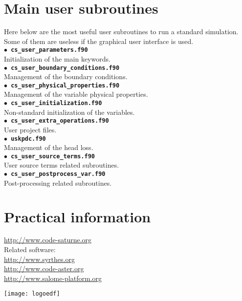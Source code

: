 \documentclass[a4paper,11pt]{article}
\newcommand{\refword}[1]{\texttt{$\bullet$ \bf{#1}}}
\begin{document}
\begin{multicols*}{3}

\section*{Main user subroutines}

Here below are the most useful user subroutines to run a standard
simulation. Some of them are useless if the graphical user interface
is used.\\

\refword{cs\_user\_parameters.f90}\\
Initialization of the main keywords.\\

\refword{cs\_user\_boundary\_conditions.f90}\\
Management of the boundary conditions.\\

\refword{cs\_user\_physical\_properties.f90}\\
Management of the variable physical properties.\\

\refword{cs\_user\_initialization.f90}\\
Non-standard initialization of the variables.\\

\refword{cs\_user\_extra\_operations.f90}\\
User project files.\\

\refword{uskpdc.f90}\\
Management of the head loss.\\

\refword{cs\_user\_source\_terms.f90}\\
User source terms related subroutines.\\

\refword{cs\_user\_postprocess\_var.f90}\\
Post-processing related subroutines.\\




\section*{Practical information}

\url{http://www.code-saturne.org}\\

Related software:\\
\url{http://www.syrthes.org}\\
\url{http://www.code-aster.org}\\
\url{http://www.salome-platform.org}

\begin{center}
  \texttt{[image: logoedf]}
\end{center}

\end{multicols*}
\end{document}
